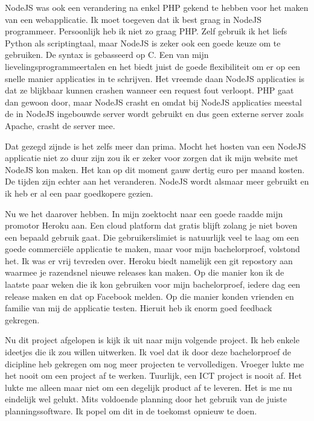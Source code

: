 \documentclass[a4paper,11pt]{article}
\begin{document}
NodeJS was ook een verandering na enkel PHP gekend te hebben voor het maken van een webapplicatie. Ik moet toegeven dat ik best graag in NodeJS programmeer. Persoonlijk heb ik niet zo graag PHP. Zelf gebruik ik het liefs Python als scriptingtaal, maar NodeJS is zeker ook een goede keuze om te gebruiken. De syntax is gebasseerd op C. Een van mijn lievelingsprogrammeertalen en het biedt juist de goede flexibiliteit om er op een snelle manier applicaties in te schrijven. Het vreemde daan NodeJS applicaties is dat ze blijkbaar kunnen crashen wanneer een request fout verloopt. PHP gaat dan gewoon door, maar NodeJS crasht en omdat bij NodeJS applicaties meestal de in NodeJS ingebouwde server wordt gebruikt en dus geen externe server zoals Apache, crasht de server mee.

Dat gezegd zijnde is het zelfs meer dan prima. Mocht het hosten van een NodeJS applicatie niet zo duur zijn zou ik er zeker voor zorgen dat ik mijn website met NodeJS kon maken. Het kan op dit moment gauw dertig euro per maand kosten. De tijden zijn echter aan het veranderen. NodeJS wordt alsmaar meer gebruikt en ik heb er al een paar goedkopere gezien.

Nu we het daarover hebben. In mijn zoektocht naar een goede raadde mijn promotor Heroku aan. Een cloud platform dat gratis blijft zolang je niet boven een bepaald gebruik gaat. Die gebruikerslimiet is natuurlijk veel te laag om een goede commerciële applicatie te maken, maar voor mijn bachelorproef, volstond het. Ik was er vrij tevreden over. Heroku biedt namelijk een git repostory aan waarmee je razendsnel nieuwe releases kan maken. Op die manier kon ik de laatste paar weken die ik kon gebruiken voor mijn bachelorproef, iedere dag een release maken en dat op Facebook melden. Op die manier konden vrienden en familie van mij de applicatie testen. Hieruit heb ik enorm goed feedback gekregen.

Nu dit project afgelopen is kijk ik uit naar mijn volgende project. Ik heb enkele ideetjes die ik zou willen uitwerken. Ik voel dat ik door deze bachelorproef de dicipline heb gekregen om nog meer projecten te vervolledigen. Vroeger lukte me het nooit om een project af te werken. Tuurlijk, een ICT project is nooit af. Het lukte me alleen maar niet om een degelijk product af te leveren. Het is me nu eindelijk wel gelukt. Mits voldoende planning door het gebruik van de juiste planningssoftware. Ik popel om dit in de toekomst opnieuw te doen.



\end{document}
